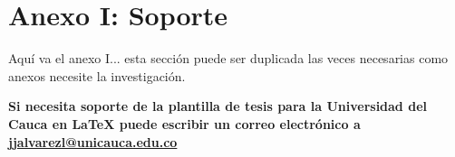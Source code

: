 \chapter{Anexo I: Soporte}
\ifpdf
    \graphicspath{{Appendix1/Appendix1Figs/PNG/}{Appendix1/Appendix1Figs/PDF/}{Appendix1/Appendix1Figs/}}
\else
    \graphicspath{{Appendix1/Appendix1Figs/EPS/}{Appendix1/Appendix1Figs/}}
\fi


Aquí va el anexo I... esta sección puede ser duplicada las veces necesarias como anexos necesite la investigación.

\textbf{Si necesita soporte de la plantilla de tesis para la Universidad del Cauca en \LaTeX{} puede escribir un correo electrónico a \href{mailto:jjalvarezl@unicauca.edu.co}{jjalvarezl@unicauca.edu.co}}


